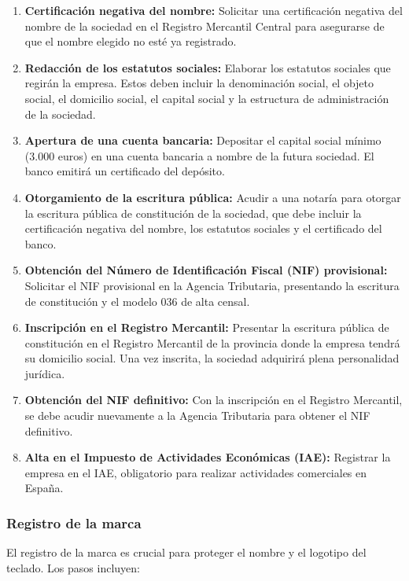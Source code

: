 \begin{enumerate}
    \item \textbf{Certificación negativa del nombre:} Solicitar una certificación negativa del nombre de la sociedad en el Registro Mercantil Central para asegurarse de que el nombre elegido no esté ya registrado.
    \item \textbf{Redacción de los estatutos sociales:} Elaborar los estatutos sociales que regirán la empresa. Estos deben incluir la denominación social, el objeto social, el domicilio social, el capital social y la estructura de administración de la sociedad.
    \item \textbf{Apertura de una cuenta bancaria:} Depositar el capital social mínimo (3.000 euros) en una cuenta bancaria a nombre de la futura sociedad. El banco emitirá un certificado del depósito.
    \item \textbf{Otorgamiento de la escritura pública:} Acudir a una notaría para otorgar la escritura pública de constitución de la sociedad, que debe incluir la certificación negativa del nombre, los estatutos sociales y el certificado del banco.
    \item \textbf{Obtención del Número de Identificación Fiscal (NIF) provisional:} Solicitar el NIF provisional en la Agencia Tributaria, presentando la escritura de constitución y el modelo 036 de alta censal.
    \item \textbf{Inscripción en el Registro Mercantil:} Presentar la escritura pública de constitución en el Registro Mercantil de la provincia donde la empresa tendrá su domicilio social. Una vez inscrita, la sociedad adquirirá plena personalidad jurídica.
    \item \textbf{Obtención del NIF definitivo:} Con la inscripción en el Registro Mercantil, se debe acudir nuevamente a la Agencia Tributaria para obtener el NIF definitivo.
    \item \textbf{Alta en el Impuesto de Actividades Económicas (IAE):} Registrar la empresa en el IAE, obligatorio para realizar actividades comerciales en España.
\end{enumerate}

\subsubsection{Registro de la marca}

El registro de la marca es crucial para proteger el nombre y el logotipo del teclado. Los pasos incluyen:

